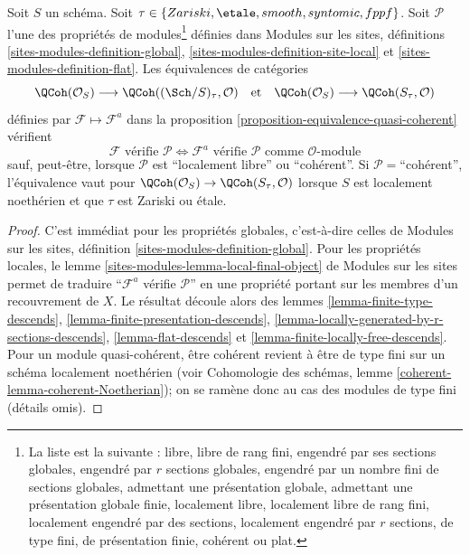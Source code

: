 \begin{lemma}
\label{lemma-equivalence-quasi-coherent-properties}
Soit $S$ un schéma.
Soit $\tau \in \{Zariski, \linebreak[0] \etale, \linebreak[0]
smooth, \linebreak[0] syntomic, \linebreak[0] fppf\}$.
Soit $\mathcal{P}$ l'une des propriétés de modules\footnote{La liste est
la suivante : libre, libre de rang fini, engendré par ses sections globales,
engendré par $r$ sections globales, engendré par un nombre fini de sections
globales, admettant une présentation globale, admettant une présentation
globale finie, localement libre, localement libre de rang fini, localement
engendré par des sections, localement engendré par $r$ sections, de type
fini, de présentation finie, cohérent ou plat.} définies dans Modules sur
les sites, définitions \ref{sites-modules-definition-global},
\ref{sites-modules-definition-site-local} et
\ref{sites-modules-definition-flat}. Les équivalences de catégories
$$
\QCoh(\mathcal{O}_S)
\longrightarrow
\QCoh((\Sch/S)_\tau, \mathcal{O})
\quad\text{et}\quad
\QCoh(\mathcal{O}_S)
\longrightarrow
\QCoh(S_\tau, \mathcal{O})
$$
définies par $\mathcal{F} \mapsto \mathcal{F}^a$ dans la proposition
\ref{proposition-equivalence-quasi-coherent} vérifient
$$
\mathcal{F}\text{ vérifie }\mathcal{P}
\Leftrightarrow
\mathcal{F}^a\text{ vérifie }\mathcal{P}\text{ comme }\mathcal{O}\text{-module}
$$
sauf, peut-être, lorsque $\mathcal{P}$ est ``localement libre'' ou
``cohérent''. Si $\mathcal{P}=$``cohérent'',
l'équivalence vaut pour
$\QCoh(\mathcal{O}_S) \to \QCoh(S_\tau, \mathcal{O})$ lorsque $S$ est
localement noethérien et que $\tau$ est Zariski ou \'etale.
\end{lemma}

\begin{proof}
C'est immédiat pour les propriétés globales, c'est-à-dire celles de
Modules sur les sites, définition \ref{sites-modules-definition-global}.
Pour les propriétés locales, le lemme
\ref{sites-modules-lemma-local-final-object} de Modules sur les sites
permet de traduire ``$\mathcal{F}^a$ vérifie $\mathcal{P}$'' en une
propriété portant sur les membres d'un recouvrement de $X$. Le résultat
découle alors des lemmes \ref{lemma-finite-type-descends},
\ref{lemma-finite-presentation-descends},
\ref{lemma-locally-generated-by-r-sections-descends},
\ref{lemma-flat-descends} et
\ref{lemma-finite-locally-free-descends}. Pour un module quasi-cohérent,
être cohérent revient à être de type fini sur un schéma localement
noethérien (voir Cohomologie des schémas, lemme
\ref{coherent-lemma-coherent-Noetherian}); on se ramène donc au cas des
modules de type fini (détails omis).
\end{proof}










